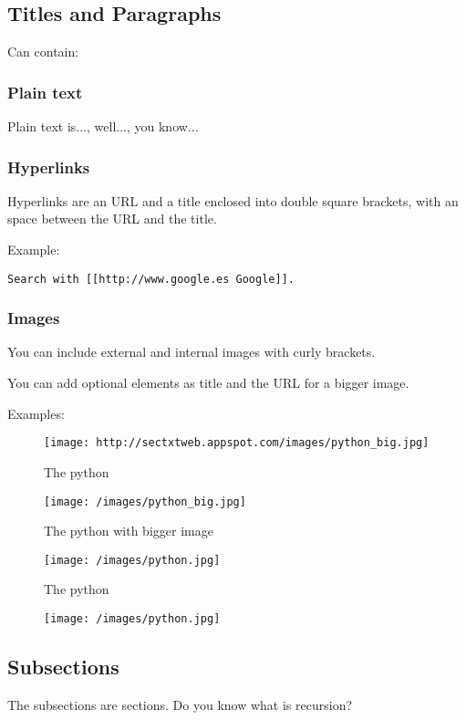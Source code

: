 \documentclass[a4paper,11pt]{article}
\begin{document}
\subsection{Titles and Paragraphs }
Can contain:

\subsubsection{Plain text}
Plain text is..., well..., you know...

\subsubsection{Hyperlinks}
Hyperlinks are an URL and a title enclosed into double square
brackets, with an space between the URL and the title.

Example:

\begin{verbatim}
Search with [[http://www.google.es Google]].
\end{verbatim}
\subsubsection{Images}
You can include external and internal images with curly brackets.	

You can add optional elements as title and the URL for a bigger image.

Examples:

\begin{figure}[ht!]
		\centering
		\texttt{[image: http://sectxtweb.appspot.com/images/python\_big.jpg]}
		\caption{The python}
		\label{overflow}
		\end{figure}
		

\begin{figure}[ht!]
		\centering
		\texttt{[image: /images/python\_big.jpg]}
		\caption{The python with bigger image}
		\label{overflow}
		\end{figure}
		

\begin{figure}[ht!]
		\centering
		\texttt{[image: /images/python.jpg]}
		\caption{The python}
		\label{overflow}
		\end{figure}
		

\begin{figure}[ht!]
		\centering
		\texttt{[image: /images/python.jpg]}
		\label{overflow}
		\end{figure}
		

\subsection{Subsections}
The subsections are sections. Do you know what is recursion?
\end{document}
